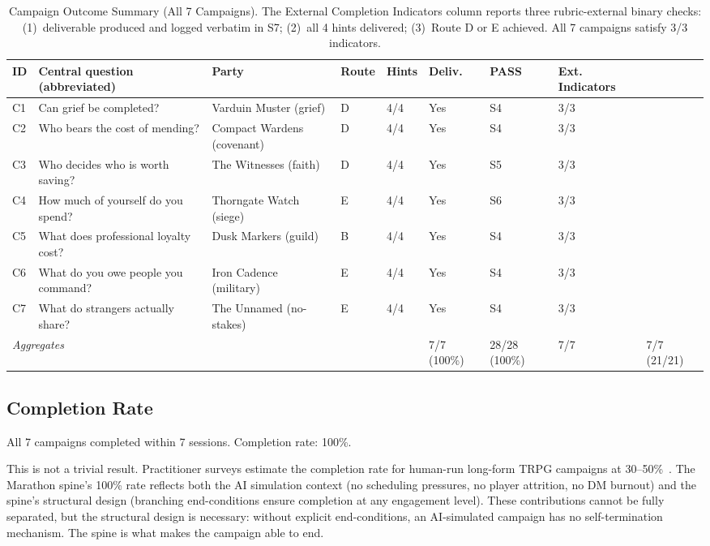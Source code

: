 \begin{table}[t]
\caption{Campaign Outcome Summary (All 7 Campaigns). The External Completion Indicators
  column reports three rubric-external binary checks: (1)~deliverable produced and logged
  verbatim in S7; (2)~all 4 hints delivered; (3)~Route D or E achieved. All 7 campaigns
  satisfy 3/3 indicators.}
\label{tab:campaign-outcomes}
\begin{tabular}{@{}lp{3.0cm}lp{2.4cm}p{3.2cm}llll@{}}
\toprule
ID & Central question (abbreviated) & Party & Route & Hints & Deliv. & PASS & Ext. Indicators \\
\midrule
C1 & Can grief be completed? & Varduin Muster (grief) & D & 4/4 & Yes & S4 & 3/3 \\
C2 & Who bears the cost of mending? & Compact Wardens (covenant) & D & 4/4 & Yes & S4 & 3/3 \\
C3 & Who decides who is worth saving? & The Witnesses (faith) & D & 4/4 & Yes & S5 & 3/3 \\
C4 & How much of yourself do you spend? & Thorngate Watch (siege) & E & 4/4 & Yes & S6 & 3/3 \\
C5 & What does professional loyalty cost? & Dusk Markers (guild) & B & 4/4 & Yes & S4 & 3/3 \\
C6 & What do you owe people you command? & Iron Cadence (military) & E & 4/4 & Yes & S4 & 3/3 \\
C7 & What do strangers actually share? & The Unnamed (no-stakes) & E & 4/4 & Yes & S4 & 3/3 \\
\midrule
\multicolumn{5}{l}{\textit{Aggregates}} & 7/7 (100\%) & 28/28 (100\%) & 7/7 & 7/7 (21/21) \\
\bottomrule
\end{tabular}
\end{table}

\subsection{Completion Rate}

All 7 campaigns completed within 7 sessions. Completion rate: 100\%.

This is not a trivial result. Practitioner surveys estimate the completion rate
for human-run long-form TRPG campaigns at 30--50\%~\cite{perkins2017dungeon}. The
Marathon spine's 100\% rate reflects both the AI simulation context (no scheduling
pressures, no player attrition, no DM burnout) and the spine's structural design
(branching end-conditions ensure completion at any engagement level). These
contributions cannot be fully separated, but the structural design is necessary:
without explicit end-conditions, an AI-simulated campaign has no self-termination
mechanism. The spine is what makes the campaign able to end.

